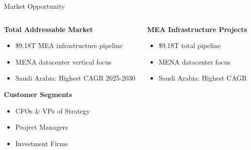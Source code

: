 \documentclass[aspectratio=169]{beamer}
\begin{document}
\begin{frame}{Market Opportunity}
    \begin{columns}
        \begin{column}{0.5\textwidth}
            \textbf{Total Addressable Market}
            \begin{itemize}
                \item \$9.18T MEA infrastructure pipeline
                \item MENA datacenter vertical focus
                \item Saudi Arabia: Highest CAGR 2025-2030
            \end{itemize}
            
            \vspace{1cm}
            \textbf{Customer Segments}
            \begin{itemize}
                \item CFOs \& VPs of Strategy
                \item Project Managers
                \item Investment Firms
            \end{itemize}
        \end{column}
        \begin{column}{0.5\textwidth}
            \begin{center}
                \textbf{MEA Infrastructure Projects}
                \vspace{0.5cm}
                \begin{itemize}
                    \item \$9.18T total pipeline
                    \item MENA datacenter focus
                    \item Saudi Arabia: Highest CAGR
                \end{itemize}
            \end{center}
        \end{column}
    \end{columns}
\end{frame}
\end{document}
